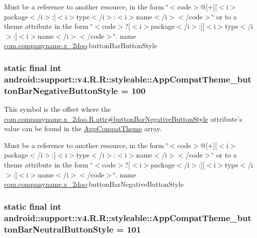 Must be a reference to another resource, in the form \char`\"{}$<$code$>$@\mbox{[}+\mbox{]}\mbox{[}$<$i$>$package$<$/i$>$:\mbox{]}$<$i$>$type$<$/i$>$:$<$i$>$name$<$/i$>$$<$/code$>$\char`\"{} or to a theme attribute in the form \char`\"{}$<$code$>$?\mbox{[}$<$i$>$package$<$/i$>$:\mbox{]}\mbox{[}$<$i$>$type$<$/i$>$:\mbox{]}$<$i$>$name$<$/i$>$$<$/code$>$\char`\"{}.  name \hyperlink{namespacecom_1_1companyname_1_1x__2doo}{com.companyname.x\_\-2doo}:buttonBarButtonStyle \hypertarget{classandroid_1_1support_1_1v4_1_1_r_1_1styleable_4a4d3c9d83cb64f07235f8be079992a4}{
\subsubsection[{AppCompatTheme\_\-buttonBarNegativeButtonStyle}]{\setlength{\rightskip}{0pt plus 5cm}static final int android::support::v4.R.R::styleable::AppCompatTheme\_\-buttonBarNegativeButtonStyle = 100}}
\label{classandroid_1_1support_1_1v4_1_1_r_1_1styleable_4a4d3c9d83cb64f07235f8be079992a4}


This symbol is the offset where the \hyperlink{classcom_1_1companyname_1_1x__2doo_1_1_r_1_1attr_5bfce6820b99f5e96606181469a7ac60}{com.companyname.x\_\-2doo.R.attr\#buttonBarNegativeButtonStyle} attribute's value can be found in the \hyperlink{classandroid_1_1support_1_1v4_1_1_r_1_1styleable_0873e92ba21076bb5a4aeadeb7f5779f}{AppCompatTheme} array.

Must be a reference to another resource, in the form \char`\"{}$<$code$>$@\mbox{[}+\mbox{]}\mbox{[}$<$i$>$package$<$/i$>$:\mbox{]}$<$i$>$type$<$/i$>$:$<$i$>$name$<$/i$>$$<$/code$>$\char`\"{} or to a theme attribute in the form \char`\"{}$<$code$>$?\mbox{[}$<$i$>$package$<$/i$>$:\mbox{]}\mbox{[}$<$i$>$type$<$/i$>$:\mbox{]}$<$i$>$name$<$/i$>$$<$/code$>$\char`\"{}.  name \hyperlink{namespacecom_1_1companyname_1_1x__2doo}{com.companyname.x\_\-2doo}:buttonBarNegativeButtonStyle \hypertarget{classandroid_1_1support_1_1v4_1_1_r_1_1styleable_2e6df35632dfd48914323050d05c0a30}{
\subsubsection[{AppCompatTheme\_\-buttonBarNeutralButtonStyle}]{\setlength{\rightskip}{0pt plus 5cm}static final int android::support::v4.R.R::styleable::AppCompatTheme\_\-buttonBarNeutralButtonStyle = 101}}
\label{classandroid_1_1support_1_1v4_1_1_r_1_1styleable_2e6df35632dfd48914323050d05c0a30}


